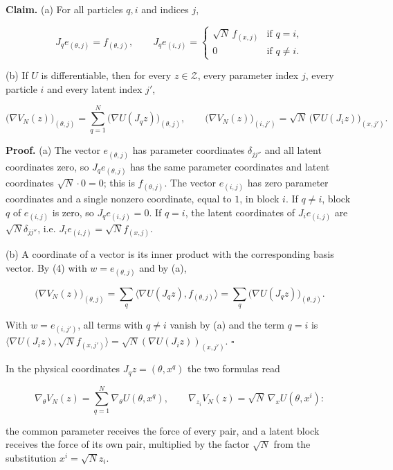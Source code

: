 \documentclass[11pt,a4paper]{report}
\begin{document}
\textbf{Claim.} (a) For all particles \(q,i\) and indices \(j\),


\[J_qe_{(\theta,j)}=f_{(\theta,j)},\qquad J_qe_{(i,j)}=\begin{cases}\sqrt N\,f_{(x,j)}&\text{if }q=i,\\0&\text{if }q\neq i.\end{cases}\]


(b) If \(U\) is differentiable, then for every \(z\in\mathcal Z\), every parameter index \(j\), every particle \(i\) and every latent index \(j'\),


\[\bigl(\nabla V_N(z)\bigr)_{(\theta,j)}=\sum_{q=1}^N\bigl(\nabla U(J_qz)\bigr)_{(\theta,j)},\qquad\bigl(\nabla V_N(z)\bigr)_{(i,j')}=\sqrt N\,\bigl(\nabla U(J_iz)\bigr)_{(x,j')} .\]


\textbf{Proof.} (a) The vector \(e_{(\theta,j)}\) has parameter coordinates \(\delta_{jj''}\) and all latent coordinates zero, so \(J_qe_{(\theta,j)}\) has the same parameter coordinates and latent coordinates \(\sqrt N\cdot0=0\); this is \(f_{(\theta,j)}\). The vector \(e_{(i,j)}\) has zero parameter coordinates and a single nonzero coordinate, equal to \(1\), in block \(i\). If \(q\ne i\), block \(q\) of \(e_{(i,j)}\) is zero, so \(J_qe_{(i,j)}=0\). If \(q=i\), the latent coordinates of \(J_ie_{(i,j)}\) are \(\sqrt N\delta_{jj''}\), i.e. \(J_ie_{(i,j)}=\sqrt Nf_{(x,j)}\).




(b) A coordinate of a vector is its inner product with the corresponding basis vector. By (4) with \(w=e_{(\theta,j)}\) and by (a),


\[\bigl(\nabla V_N(z)\bigr)_{(\theta,j)}=\sum_q\bigl\langle\nabla U(J_qz),f_{(\theta,j)}\bigr\rangle=\sum_q\bigl(\nabla U(J_qz)\bigr)_{(\theta,j)} .\]


With \(w=e_{(i,j')}\), all terms with \(q\ne i\) vanish by (a) and the term \(q=i\) is \(\langle\nabla U(J_iz),\sqrt Nf_{(x,j')}\rangle=\sqrt N(\nabla U(J_iz))_{(x,j')}\). \(\square\)




In the physical coordinates \(J_qz=(\theta,x^q)\) the two formulas read


\[\nabla_\theta V_N(z)=\sum_{q=1}^N\nabla_\theta U(\theta,x^q),\qquad\nabla_{z_i}V_N(z)=\sqrt N\,\nabla_xU(\theta,x^i):\]


the common parameter receives the force of every pair, and a latent block receives the force of its own pair, multiplied by the factor \(\sqrt N\) from the substitution \(x^i=\sqrt Nz_i\).
\end{document}

